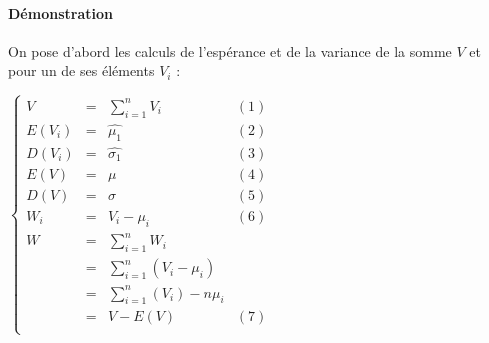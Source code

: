 \paragraph{Démonstration}
On pose d'abord les calculs de l'espérance et de la variance de la somme $V$ et pour un de ses éléments $V_i$ :
\begin{center}
$\left\{\begin{array}{LCLC}
V        &=& \sum_{i=1}^n V_i&(1)\\
E( V_i ) &=& \widehat{\mu_1}&(2)\\
D( V_i ) &=& \widehat{\sigma_1}&(3)\\
E( V )   &=& \mu&(4)\\
D( V )   &=& \sigma&(5)\\
W_i      &=& V_i - \mu_i&(6)\\
W        &=& \sum_{i=1}^n W_i\\
         &=& \sum_{i=1}^n  (V_i - \mu_i)\\
         &=& \sum_{i=1}^n  (V_i) - n\mu_i\\
         &=& V - E ( V )&(7)\\
\end{array}\right.$
\end{center}

